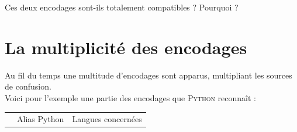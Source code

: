 \begin{exercice}[]
    Ces deux encodages sont-ils totalement compatibles ? Pourquoi ?
\end{exercice}

\section{La multiplicité des encodages}

Au fil du temps une multitude d'encodages sont apparus, multipliant les sources de confusion.\\
Voici pour l'exemple une partie des encodages que \textsc{Python} reconnaît :
\alternaterowcolors
\begin{center}
    {\tiny
        \begin{tabular}{CCC}
            
             & {\boxfont\color{white}Alias Python}                                      & {\boxfont\color{white}Langues concernées}             \\
            

\end{tabular}}
\end{center}
